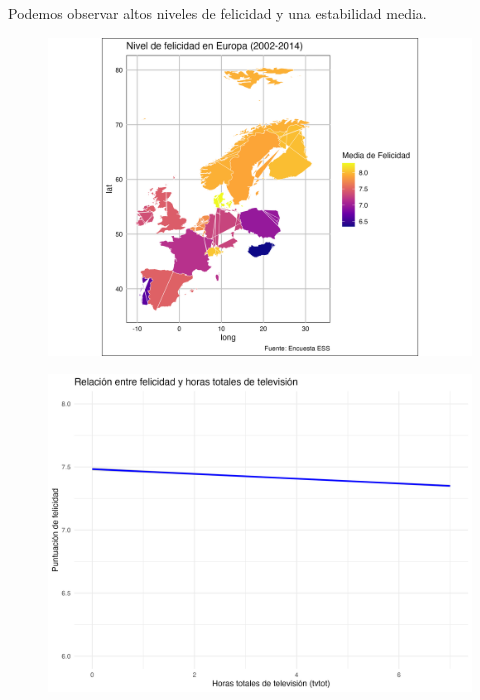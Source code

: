 \documentclass{article}
\begin{document}
Podemos observar altos niveles de felicidad y una estabilidad media. 

\begin{figure}[h!]
\includegraphics[scale=0.8]{grafico2.png}
\end{figure}



\begin{figure}[h!]
\includegraphics[scale=0.8]{grafico3.png}
\end{figure}
\end{document}

